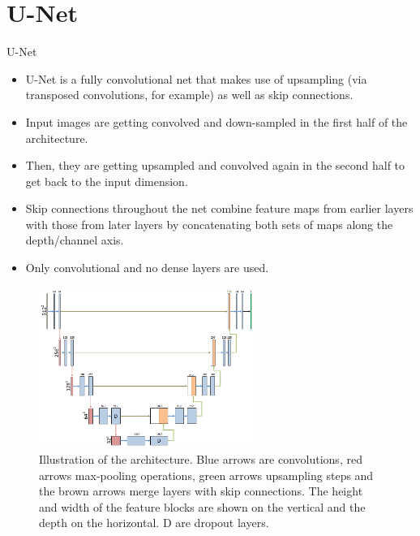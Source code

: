  \section{U-Net}
\begin{vbframe}{U-Net}

      \begin{itemize}
        \item U-Net is a fully convolutional net that makes use of upsampling (via transposed convolutions, for example) as well as skip connections.
        \item Input images are getting convolved and down-sampled in the first half of the architecture.
        \item Then, they are getting upsampled and convolved again in the second half to get back to the input dimension.
        \item Skip connections throughout the net combine feature maps from earlier layers with those from later layers by concatenating both sets of maps along the depth/channel axis.
        \item Only convolutional and no dense layers are used.
    \end{itemize}
\framebreak
    \begin{figure}
        \centering
        \includegraphics[width=7cm]{plots/outlook/unet.png}
        \caption{Illustration of the architecture. Blue arrows are convolutions, red arrows max-pooling operations, green arrows upsampling steps and the brown arrows merge layers with skip connections. The height and width of the feature blocks are shown on the vertical and the depth on the horizontal. D are dropout layers.}
    \end{figure}
    
\end{vbframe}


